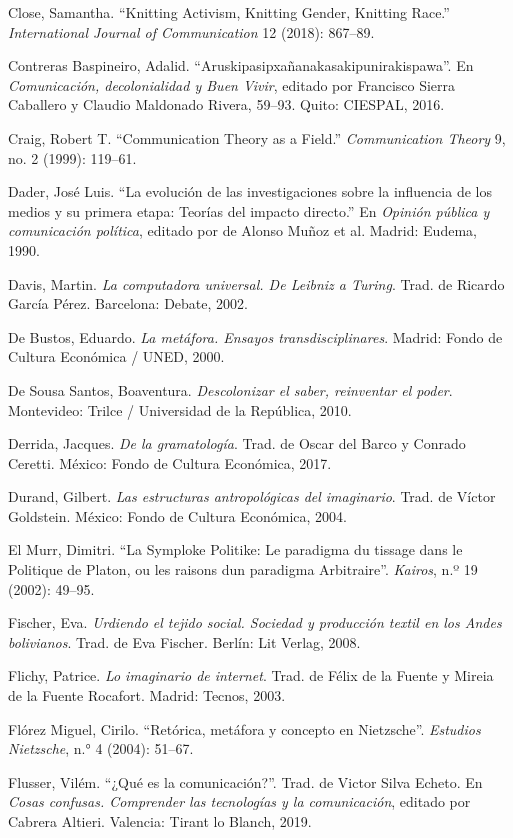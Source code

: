 \documentclass{tufte-handout}
\begin{document}
\begin{hangparas}{.25in}{1}
Close, Samantha. ``Knitting Activism, Knitting Gender, Knitting Race.''
\emph{International Journal of Communication} 12 (2018): 867--89.

Contreras Baspineiro, Adalid. ``Aruskipasipxañanakasakipunirakispawa''.
En \emph{Comunicación, decolonialidad y Buen Vivir}, editado por
Francisco Sierra Caballero y Claudio Maldonado Rivera, 59--93. Quito:
CIESPAL, 2016.

Craig, Robert T. ``Communication Theory as a Field.''
\emph{Communication Theory} 9, no. 2 (1999): 119--61.

Dader, José Luis. ``La evolución de las investigaciones sobre la
influencia de los medios y su primera etapa: Teorías del impacto
directo.'' En \emph{Opinión pública y comunicación política}, editado
por de Alonso Muñoz et al. Madrid: Eudema, 1990.

Davis, Martin. \emph{La computadora universal. De Leibniz a Turing}.
Trad. de Ricardo García Pérez. Barcelona: Debate, 2002.

De Bustos, Eduardo. \emph{La metáfora. Ensayos transdisciplinares}.
Madrid: Fondo de Cultura Económica / UNED, 2000.

De Sousa Santos, Boaventura. \emph{Descolonizar el saber, reinventar el
poder}. Montevideo: Trilce / Universidad de la República, 2010.

Derrida, Jacques. \emph{De la gramatología}. Trad. de Oscar del Barco y
Conrado Ceretti. México: Fondo de Cultura Económica, 2017.

Durand, Gilbert. \emph{Las estructuras antropológicas del imaginario}.
Trad. de Víctor Goldstein. México: Fondo de Cultura Económica, 2004.

El Murr, Dimitri. ``La Symploke Politike: Le paradigma du tissage dans
le Politique de Platon, ou les raisons d\textquotesingle un paradigma
Arbitraire''. \emph{Kairos}, n.º 19 (2002): 49--95.

Fischer, Eva. \emph{Urdiendo el tejido social. Sociedad y producción
textil en los Andes bolivianos}. Trad. de Eva Fischer. Berlín: Lit
Verlag, 2008.

Flichy, Patrice. \emph{Lo imaginario de internet}. Trad. de Félix de la
Fuente y Mireia de la Fuente Rocafort. Madrid: Tecnos, 2003.

Flórez Miguel, Cirilo. ``Retórica, metáfora y concepto en Nietzsche''.
\emph{Estudios Nietzsche}, n.° 4 (2004): 51--67.

Flusser, Vilém. ``¿Qué es la comunicación?''. Trad. de Victor Silva
Echeto. En \emph{Cosas confusas. Comprender las tecnologías y la
comunicación}, editado por Cabrera Altieri. Valencia: Tirant lo Blanch,
2019.


\end{hangparas}
\end{document}
